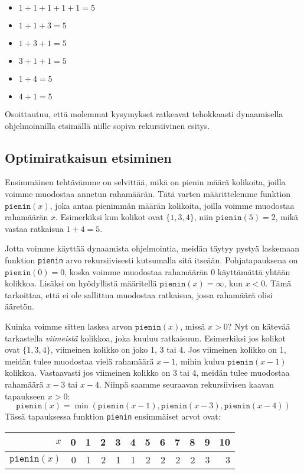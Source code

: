 \begin{multicols}{2}
\begin{itemize}
\item $1+1+1+1+1=5$
\item $1+1+3=5$
\item $1+3+1=5$
\item $3+1+1=5$
\item $1+4=5$
\item $4+1=5$
\end{itemize}
\end{multicols}

Osoittautuu, että molemmat kysymykset ratkeavat tehokkaasti
dynaamisella ohjelmoinnilla
etsimällä niille sopiva rekursiivinen esitys.

\subsection{Optimiratkaisun etsiminen}

Ensimmäinen tehtävämme on selvittää, mikä on pienin määrä
kolikoita, joilla voimme muodostaa annetun rahamäärän.
Tätä varten määrittelemme funktion $\texttt{pienin}(x)$,
joka antaa pienimmän määrän kolikoita, joilla voimme
muodostaa rahamäärän $x$.
Esimerkiksi kun kolikot ovat $\{1,3,4\}$,
niin $\texttt{pienin}(5)=2$, mikä vastaa ratkaisua $1+4=5$.

Jotta voimme käyttää dynaamista ohjelmointia,
meidän täytyy pystyä laskemaan funktion \texttt{pienin}
arvo rekursiivisesti kutsumalla sitä itseään.
Pohjatapauksena on $\texttt{pienin}(0)=0$, koska voimme
muodostaa rahamäärän 0 käyttämättä yhtään kolikkoa.
Lisäksi on hyödyllistä määritellä $\texttt{pienin}(x)=\infty$,
kun $x<0$. Tämä tarkoittaa, että ei ole sallittua muodostaa
ratkaisua, jossa rahamäärä olisi ääretön.

Kuinka voimme sitten laskea arvon $\texttt{pienin}(x)$,
missä $x>0$? Nyt on kätevää tarkastella \emph{viimeistä}
kolikkoa, joka kuuluu ratkaisuun.
Esimerkiksi jos kolikot ovat $\{1,3,4\}$, viimeinen kolikko
on joko 1, 3 tai 4.
Jos viimeinen kolikko on 1, meidän tulee muodostaa vielä
rahamäärä $x-1$, mihin kuluu $\texttt{pienin}(x-1)$ kolikkoa.
Vastaavasti jos viimeinen kolikko on 3 tai 4,
meidän tulee muodostaa rahamäärä $x-3$ tai $x-4$.
Niinpä saamme seuraavan rekursiivisen kaavan tapaukseen $x>0$:
\[
\texttt{pienin}(x) =
    \min(\texttt{pienin}(x-1),\texttt{pienin}(x-3),\texttt{pienin}(x-4))
\]
Tässä tapauksessa funktion \texttt{pienin} ensimmäiset arvot ovat:

\begin{center}
\begin{tabular}{rrrrrrrrrrrr}
$x$ & 0 & 1 & 2 & 3 & 4 & 5 & 6 & 7 & 8 & 9 & 10 \\
\hline
$\texttt{pienin}(x)$ & 0 & 1 & 2 & 1 & 1 & 2 & 2 & 2 & 2 & 3 & 3 \\
\end{tabular}
\end{center}


